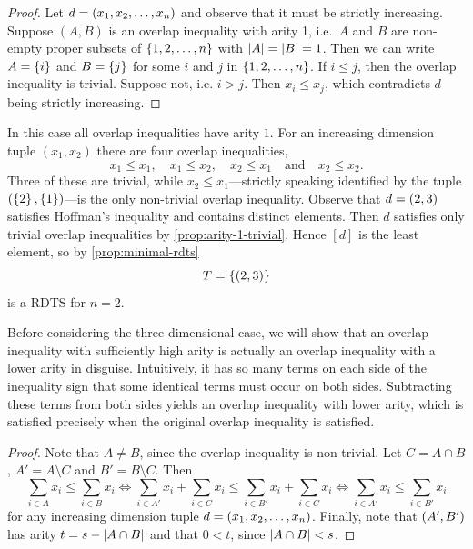 \begin{proof}
Let $d = \left( x_1, x_2, \dotsc, x_n \right)$ and observe that it must be strictly increasing. Suppose $(A, B)$ is an overlap inequality with arity 1, i.e.\ $A$ and $B$ are non-empty proper subsets of $\left\{ 1, 2, \dotsc, n \right\}$ with $\lvert A\rvert = \lvert B\rvert = 1$. Then we can write $A = \left\{ i \right\}$ and $B = \left\{ j \right\}$ for some $i$ and $j$ in $\left\{ 1, 2, \dotsc, n \right\}$. If $i \leq j$, then the overlap inequality is trivial. Suppose not, i.e. $i > j$. Then $x_i \leq x_j$, which contradicts $d$ being strictly increasing.
\end{proof}

\begin{example}[RDTS for $n = 2$]
In this case all overlap inequalities have arity $1$. For an increasing dimension tuple $(x_1, x_2)$ there are four overlap inequalities,
\[
x_1 \leq x_1, \quad x_1 \leq x_2, \quad x_2 \leq x_1 \quad \text{and} \quad x_2 \leq x_2.
\]
Three of these are trivial, while $x_2 \leq x_1$---strictly speaking identified by the tuple $(\left\{ 2 \right\}, \left\{ 1 \right\})$---is the only non-trivial overlap inequality. Observe that $d = \left( 2, 3 \right)$ satisfies Hoffman's inequality and contains distinct elements. Then $d$ satisfies only trivial overlap inequalities by \cref{prop:arity-1-trivial}. Hence $[d]$ is the least element, so by \cref{prop:minimal-rdts}
\[
T = \left\{ \left( 2, 3 \right) \right\}
\]
is a RDTS for $n = 2$.
\end{example}

\noindent Before considering the three-dimensional case, we will show that an overlap inequality with sufficiently high arity is actually an overlap inequality with a lower arity in disguise. Intuitively, it has so many terms on each side of the inequality sign that some identical terms must occur on both sides. Subtracting these terms from both sides yields an overlap inequality with lower arity, which is satisfied precisely when the original overlap inequality is satisfied.

\begin{proof}
Note that $A \neq B$, since the overlap inequality is non-trivial. Let $C = A \cap B$, $A' = A \setminus C$ and $B' = B \setminus C$. Then
\[
\sum_{i \in A} x_i \leq \sum_{i \in B} x_i
\iff
\sum_{i \in A'} x_i + \sum_{i \in C} x_i \leq \sum_{i \in B'} x_i + \sum_{i \in C} x_i
\iff
\sum_{i \in A'} x_i \leq \sum_{i \in B'} x_i
\]
for any increasing dimension tuple $d = \left( x_1, x_2, \dotsc, x_n \right)$. Finally, note that $\left( A', B' \right)$ has arity $t = s - \lvert A \cap B\rvert$ and that $0 < t$, since $\lvert A \cap B\rvert < s$.
\end{proof}

